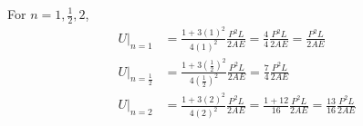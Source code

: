 For $n = 1, \frac{1}{2}, 2$,
\[
\begin{aligned}
    U|_{n=1} &= \frac{1 + 3(1)^2}{4(1)^2} \frac{P^2L}{2AE} = \frac{4}{4} \frac{P^2L}{2AE} = \boxed{\frac{P^2L}{2AE}} \\
    U|_{n=\frac{1}{2}} &= \frac{1 + 3(\frac{1}{2})^2}{4(\frac{1}{2})^2} \frac{P^2L}{2AE} = \boxed{\frac{7}{4} \frac{P^2L}{2AE}} \\
    U|_{n=2} &= \frac{1 + 3(2)^2}{4(2)^2} \frac{P^2L}{2AE} = \frac{1 + 12}{16} \frac{P^2L}{2AE} = \boxed{\frac{13}{16} \frac{P^2L}{2AE}} \\
\end{aligned}
\]